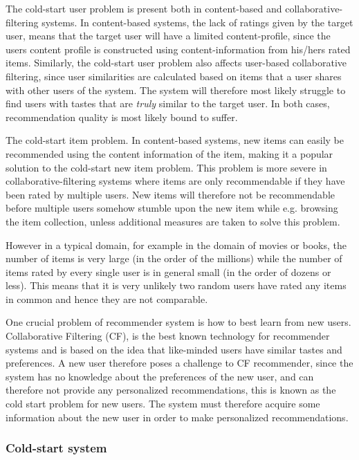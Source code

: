 The cold-start user problem is present both in content-based and
collaborative-filtering systems. In content-based systems, the lack of ratings
given by the target user, means that the target user will have a limited
content-profile, since the users content profile is constructed using
content-information from his/hers rated items. Similarly, the cold-start user
problem also affects user-based collaborative filtering, since user
similarities are calculated based on items that a user shares with other users
of the system. The system will therefore most likely struggle to find users
with tastes that are \emph{truly} similar to the target user. In both cases,
recommendation quality is most likely bound to suffer.

The cold-start item problem. In content-based systems, new items can easily be
recommended using the content information of the item, making it a popular
solution \cite{} to the cold-start new item problem. This problem is more
severe in collaborative-filtering systems where items are only recommendable if
they have been rated by multiple users. New items will therefore not be
recommendable before multiple users somehow stumble upon the new item while
e.g. browsing the item collection, unless additional measures are taken to
solve this problem.

However in a typical domain, for example in the domain of movies or books, the
number of items is very large (in the order of the millions) while the number
of items rated by every single user is in general small (in the order of dozens
or less). This means that it is very unlikely two random users have rated any
items in common and hence they are not comparable.

One crucial problem of recommender system is how to best learn from new users.
Collaborative Filtering (CF), is the best known technology for recommender
systems and is based on the idea that like-minded users have similar tastes and
preferences. A new user therefore poses a challenge to CF recommender, since
the system has no knowledge about the preferences of the new user, and can
therefore not provide any personalized recommendations, this is known as the
cold start problem for new users. The system must therefore acquire some
information about the new user in order to make personalized recommendations.

\subsubsection{Cold-start system}

